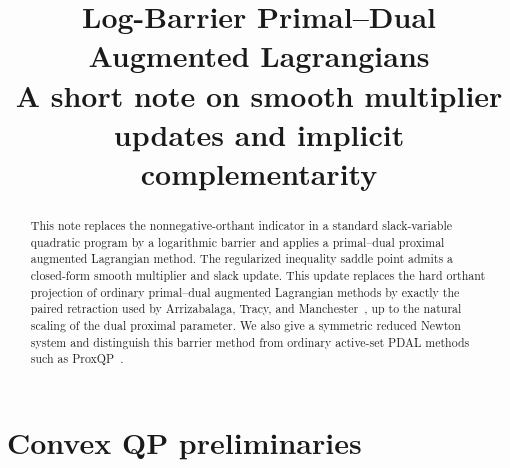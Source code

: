 \documentclass[10pt]{article}
\title{\vspace{-2.2em}Log-Barrier Primal--Dual Augmented Lagrangians\\
\large A short note on smooth multiplier updates and implicit complementarity}
\author{}
\date{}
\begin{document}
\maketitle
\vspace{-2.4em}

\begin{abstract}
This note replaces the nonnegative-orthant indicator in a standard slack-variable quadratic program by a logarithmic barrier and applies a primal--dual proximal augmented Lagrangian method. The regularized inequality saddle point admits a closed-form smooth multiplier and slack update. This update replaces the hard orthant projection of ordinary primal--dual augmented Lagrangian methods by exactly the paired retraction used by Arrizabalaga, Tracy, and Manchester~\cite{arrizabalaga2026single,arrizabalaga2026implicit}, up to the natural scaling of the dual proximal parameter. We also give a symmetric reduced Newton system and distinguish this barrier method from ordinary active-set PDAL methods such as ProxQP~\cite{bambade2022proxqp}.
\end{abstract}

\section{Convex QP preliminaries}
\end{document}
